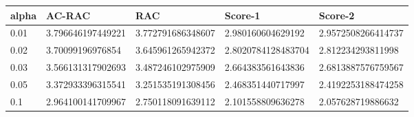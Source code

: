 \begin{tabular}{lllll}
\toprule
alpha & AC-RAC & RAC & Score-1 & Score-2 \\
\midrule
0.01 & 3.796646197449221 & 3.772791686348607 & 2.980160604629192 & 2.9572508266414737 \\
0.02 & 3.70099196976854 & 3.645961265942372 & 2.8020784128483704 & 2.812234293811998 \\
0.03 & 3.566131317902693 & 3.487246102975909 & 2.664383561643836 & 2.6813887576759567 \\
0.05 & 3.372933396315541 & 3.251535191308456 & 2.468351440717997 & 2.4192253188474258 \\
0.1 & 2.964100141709967 & 2.750118091639112 & 2.101558809636278 & 2.057628719886632 \\
\bottomrule
\end{tabular}
